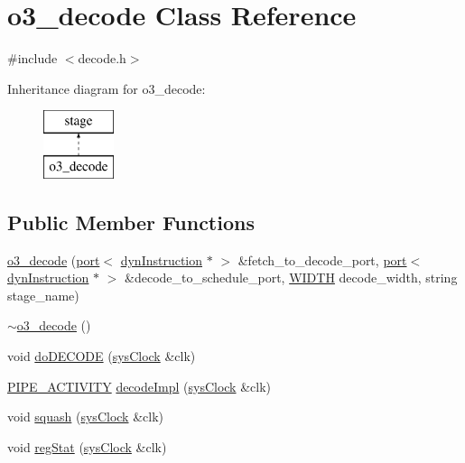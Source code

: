 \hypertarget{classo3__decode}{
\section{o3\_\-decode Class Reference}
\label{classo3__decode}
}


{\ttfamily \#include $<$decode.h$>$}

Inheritance diagram for o3\_\-decode:\begin{figure}[H]
\begin{center}
\leavevmode
\includegraphics[height=2.000000cm]{classo3__decode}
\end{center}
\end{figure}
\subsection*{Public Member Functions}
\begin{DoxyCompactItemize}
\item 
\hyperlink{classo3__decode_a1a08ce6eaa15d73ca989efcb4aff2eb5}{o3\_\-decode} (\hyperlink{classport}{port}$<$ \hyperlink{classdynInstruction}{dynInstruction} $\ast$ $>$ \&fetch\_\-to\_\-decode\_\-port, \hyperlink{classport}{port}$<$ \hyperlink{classdynInstruction}{dynInstruction} $\ast$ $>$ \&decode\_\-to\_\-schedule\_\-port, \hyperlink{global_2global_8h_a6fa2e24b8a418fa215e183264cbea3aa}{WIDTH} decode\_\-width, string stage\_\-name)
\item 
\hyperlink{classo3__decode_ac330314db5e6712640a594f0b9a424bf}{$\sim$o3\_\-decode} ()
\item 
void \hyperlink{classo3__decode_a15bf9466b893eb943e0bf245fb6513fa}{doDECODE} (\hyperlink{classsysClock}{sysClock} \&clk)
\item 
\hyperlink{unit_2stage_8h_ab00e4188e8b8974fecb1dfd12764cbb1}{PIPE\_\-ACTIVITY} \hyperlink{classo3__decode_a4421fc831622c76327f75aa763538a0d}{decodeImpl} (\hyperlink{classsysClock}{sysClock} \&clk)
\item 
void \hyperlink{classo3__decode_ab7338585819cf9e105ee595e6cb22e4b}{squash} (\hyperlink{classsysClock}{sysClock} \&clk)
\item 
void \hyperlink{classo3__decode_a925f874ac7b0ae24ff5946d468615017}{regStat} (\hyperlink{classsysClock}{sysClock} \&clk)
\end{DoxyCompactItemize}


